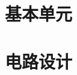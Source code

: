 \documentclass{xNoteBook}
\begin{document}

\maketitle

\frontmatter
\makesymb

\tableofcontents
\listoffigures
\listoftables

\mainmatter

\nocite{*}

\part{基本单元}





\part{电路设计}



\appendix

\backmatter



\end{document}
